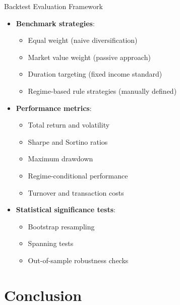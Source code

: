 \documentclass{beamer}
\begin{document}
\begin{frame}{Backtest Evaluation Framework}
\begin{itemize}
    \item \textbf{Benchmark strategies}:
    \begin{itemize}
        \item Equal weight (naive diversification)
        \item Market value weight (passive approach)
        \item Duration targeting (fixed income standard)
        \item Regime-based rule strategies (manually defined)
    \end{itemize}
    
    \item \textbf{Performance metrics}:
    \begin{itemize}
        \item Total return and volatility
        \item Sharpe and Sortino ratios
        \item Maximum drawdown
        \item Regime-conditional performance
        \item Turnover and transaction costs
    \end{itemize}
    
    \item \textbf{Statistical significance tests}:
    \begin{itemize}
        \item Bootstrap resampling
        \item Spanning tests
        \item Out-of-sample robustness checks
    \end{itemize}
\end{itemize}
\end{frame}

\section{Conclusion}
\end{document}
